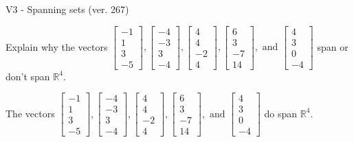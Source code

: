 \begin{exercise}
  \begin{exerciseTitle}V3 - Spanning sets (ver. 267)\end{exerciseTitle}
  \begin{exerciseStatement}
    Explain why the vectors \(\left[\begin{array}{r}
-1 \\
1 \\
3 \\
-5
\end{array}\right] , \left[\begin{array}{r}
-4 \\
-3 \\
3 \\
-4
\end{array}\right] , \left[\begin{array}{r}
4 \\
4 \\
-2 \\
4
\end{array}\right] , \left[\begin{array}{r}
6 \\
3 \\
-7 \\
14
\end{array}\right] , \text{ and } \left[\begin{array}{r}
4 \\
3 \\
0 \\
-4
\end{array}\right]\) span or don't span \(\mathbb{R}^4\). 
	


  \end{exerciseStatement}
  \begin{exerciseAnswer}
   The vectors \(\left[\begin{array}{r}
-1 \\
1 \\
3 \\
-5
\end{array}\right] , \left[\begin{array}{r}
-4 \\
-3 \\
3 \\
-4
\end{array}\right] , \left[\begin{array}{r}
4 \\
4 \\
-2 \\
4
\end{array}\right] , \left[\begin{array}{r}
6 \\
3 \\
-7 \\
14
\end{array}\right] , \text{ and } \left[\begin{array}{r}
4 \\
3 \\
0 \\
-4
\end{array}\right]\) 
  	 do  
	span \(\mathbb{R}^4\).
  



\end{exerciseAnswer}
\end{exercise}
